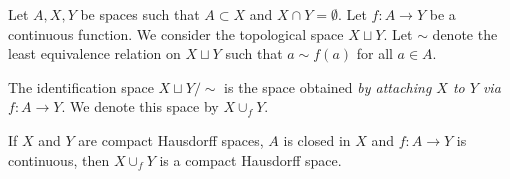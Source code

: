 \documentclass[12pt]{article}
\begin{document}
\begin{defn}
	Let $A, X, Y$ be spaces such that $A \subset X$ and $X \cap Y = \emptyset.$ Let $f:A\to Y$ be a continuous function. We consider the topological space $X \sqcup Y.$ Let $\sim$ denote the least equivalence relation on $X \sqcup Y$ such that $a \sim f(a)$ for all $a \in A.$

	The identification space $X \sqcup Y/{\sim}$ is the space obtained \emph{by attaching $X$ to $Y$ via $f: A \to Y$}. We denote this space by $X \cup_f Y.$
\end{defn}

\begin{prop}
	If $X$ and $Y$ are compact Hausdorff spaces, $A$ is closed in $X$ and $f:A \to Y$ is continuous, then $X \cup_f Y$ is a compact Hausdorff space.
\end{prop}
\end{document}
